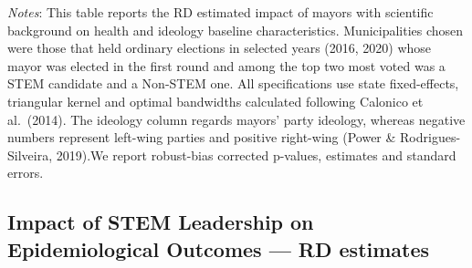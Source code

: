 \documentclass[
  letterpaper,
  DIV=11,
  numbers=noendperiod]{scrartcl}
\begin{document}
\emph{Notes}: This table reports the RD estimated impact of mayors with
scientific background on health and ideology baseline characteristics.
Municipalities chosen were those that held ordinary elections in
selected years (2016, 2020) whose mayor was elected in the first round
and among the top two most voted was a STEM candidate and a Non-STEM
one. All specifications use state fixed-effects, triangular kernel and
optimal bandwidths calculated following Calonico et al.~(2014). The
ideology column regards mayors' party ideology, whereas negative numbers
represent left-wing parties and positive right-wing (Power \&
Rodrigues-Silveira, 2019).We report robust-bias corrected p-values,
estimates and standard errors.

\subsection{Impact of STEM Leadership on Epidemiological Outcomes --- RD
estimates}\label{impact-of-stem-leadership-on-epidemiological-outcomes-rd-estimates}
\end{document}
